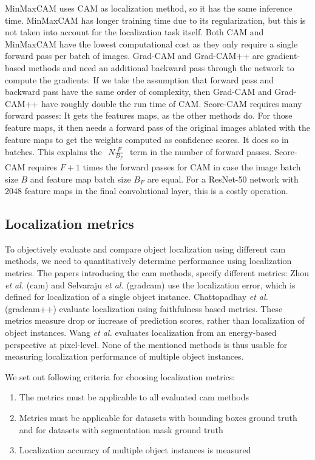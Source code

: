 MinMaxCAM uses CAM as localization method, so it has the same inference time. MinMaxCAM has longer training time due to its regularization, but this is not taken into account for the localization task itself. Both CAM and MinMaxCAM have the lowest computational cost as they only require a single forward pass per batch of images. Grad-CAM and Grad-CAM++ are gradient-based methods and need an additional backward pass through the network to compute the gradients. If we take the assumption that forward pass and backward pass have the same order of complexity, then Grad-CAM and Grad-CAM++ have roughly double the run time of CAM. Score-CAM requires many forward passes: It gets the features maps, as the other methods do. For those feature maps, it then needs a forward pass of the original images ablated with the feature maps to get the weights computed as confidence scores. It does so in batches. This explains the $\begin{aligned}N\frac{F}{B_F}\end{aligned}$ term in the number of forward passes. Score-CAM requires $F + 1$ times the forward passes for CAM in case the image batch size $B$ and feature map batch size $B_F$ are equal. For a ResNet-50 network with 2048 feature maps in the final convolutional layer, this is a costly operation.

\subsection{Localization metrics} \label{sec:localization_metrics}
To objectively evaluate and compare object localization using different \acrshort{cam} methods, we need to quantitatively determine performance using localization metrics. The papers introducing the \acrshort{cam} methods, specify different metrics: Zhou \textit{et al.} \cite{zhou2016cvpr} (\acrshort{cam}) and Selvaraju \textit{et al.} \cite{selvaraju2017grad} (\acrshort{gradcam}) use the localization error, which is defined for localization of a single object instance. Chattopadhay \textit{et al.} \cite{chattopadhay2018grad} (\acrshort{gradcam}++) evaluate localization using faithfulness based metrics. These metrics measure drop or increase of prediction scores, rather than localization of object instances. Wang \textit{et al.} \cite{wang2020score} evaluates localization from an energy-based perspective at pixel-level. None of the mentioned methods is thus usable for measuring localization performance of multiple object instances.

We set out following criteria for choosing localization metrics:
\begin{enumerate}
    \item The metrics must be applicable to all evaluated \acrshort{cam} methods
    \item Metrics must be applicable for datasets with bounding boxes ground truth and for datasets with segmentation mask ground truth
    \item Localization accuracy of multiple object instances is measured
\end{enumerate}

